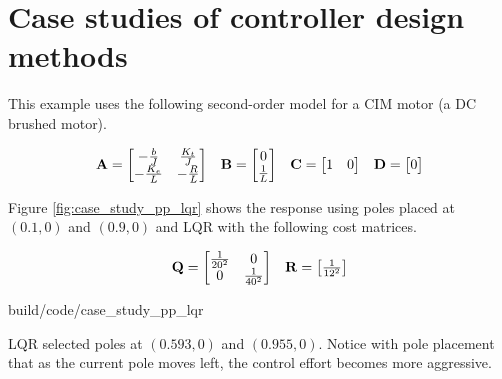 \section{Case studies of controller design methods}

This example uses the following second-order model for a CIM motor (a DC brushed
motor).

\begin{align*}
  \begin{array}{cccc}
    \mathbf{A} = \begin{bmatrix}
      -\frac{b}{J} & \frac{K_t}{J} \\
      -\frac{K_e}{L} & -\frac{R}{L}
    \end{bmatrix} &
    \mathbf{B} = \begin{bmatrix}
      0 \\
      \frac{1}{L}
    \end{bmatrix} &
    \mathbf{C} = \begin{bmatrix}
      1 & 0
    \end{bmatrix} &
    \mathbf{D} = \begin{bmatrix}
      0
    \end{bmatrix}
  \end{array}
\end{align*}

Figure \ref{fig:case_study_pp_lqr} shows the response using poles placed at
$(0.1, 0)$ and $(0.9, 0)$ and LQR with the following cost matrices.

\begin{align*}
  \begin{array}{cc}
    \mathbf{Q} = \begin{bmatrix}
      \frac{1}{20^2} & 0 \\
      0 & \frac{1}{40^2}
    \end{bmatrix} &
    \mathbf{R} = \begin{bmatrix}
      \frac{1}{12^2}
    \end{bmatrix}
  \end{array}
\end{align*}

\begin{svg}{build/code/case_study_pp_lqr}
  \caption{Second-order CIM motor response with pole placement and LQR}
  \label{fig:case_study_pp_lqr}
\end{svg}

LQR selected poles at $(0.593, 0)$ and $(0.955, 0)$. Notice with pole placement
that as the current pole moves left, the control effort becomes more aggressive.
